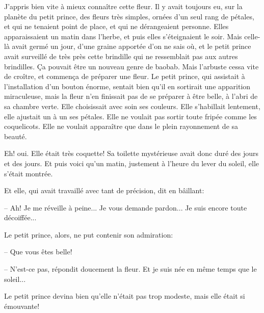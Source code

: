 \documentclass[a4paper]{report}
\begin{document}
\parachapter[VIII]{} %
J'appris bien vite à mieux connaître cette fleur. Il y avait toujours eu, sur la planète du petit prince, des fleurs très simples, ornées d'un seul rang de pétales, et qui ne tenaient point de place, et qui ne dérangeaient personne. Elles apparaissaient un matin dans l'herbe, et puis elles s'éteignaient le soir. Mais celle-là avait germé un jour, d'une graine apportée d'on ne sais où, et le petit prince avait surveillé de très près cette brindille qui ne ressemblait pas aux autres brindilles. Ça pouvait être un nouveau genre de baobab. Mais l'arbuste cessa vite de croître, et commença de préparer une fleur. Le petit prince, qui assistait à l'installation d'un bouton énorme, sentait bien qu'il en sortirait une apparition miraculeuse, mais la fleur n'en finissait pas de se préparer à être belle, à l'abri de sa chambre verte. Elle choisissait avec soin ses couleurs. Elle s'habillait lentement, elle ajustait un à un ses pétales. Elle ne voulait pas sortir toute fripée comme les coquelicots. Elle ne voulait apparaître que dans le plein rayonnement de sa beauté.

Eh! oui. Elle était très coquette! Sa toilette mystérieuse avait donc duré des jours et des jours. Et puis voici qu'un matin, justement à l'heure du lever du soleil, elle s'était montrée.

Et elle, qui avait travaillé avec tant de précision, dit en bâillant:

-- Ah! Je me réveille à peine... Je vous demande pardon... Je suis encore toute décoiffée...

Le petit prince, alors, ne put contenir son admiration:

-- Que vous êtes belle!

-- N'est-ce pas, répondit doucement la fleur. Et je suis née en même temps que le soleil...


Le petit prince devina bien qu'elle n'était pas trop modeste, mais elle était si émouvante!
\end{document}
